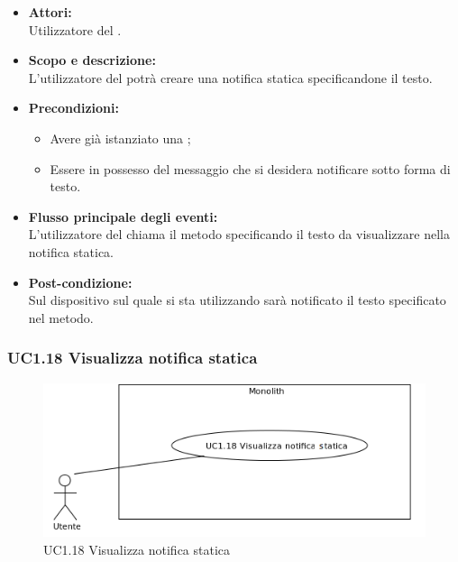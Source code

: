 \begin{itemize}
	\item \textbf{Attori:}
	\\Utilizzatore del .
	\item \textbf{Scopo e descrizione:} 
	\\L'utilizzatore del  potrà creare una notifica statica specificandone il testo.
	\item \textbf{Precondizioni:}
	\begin{itemize}
		\item Avere già istanziato una ;
		\item Essere in possesso del messaggio che si desidera notificare sotto forma di testo.
	\end{itemize}
	\item \textbf{Flusso principale degli eventi:}
	\\L'utilizzatore del  chiama il metodo specificando il testo da visualizzare nella notifica statica.
	\item \textbf{Post-condizione:}
	\\Sul dispositivo sul quale si sta utilizzando  sarà notificato il testo specificato nel metodo.
\end{itemize}

\subsubsection{UC1.18 Visualizza notifica statica} \label{UC1.18}

\begin{figure}[H]
	\centering
	\includegraphics[width=15cm]{../../documenti/AnalisiDeiRequisiti/Diagrammi_img/uc1_18.png}
	\caption{UC1.18 Visualizza notifica statica}
\end{figure}

